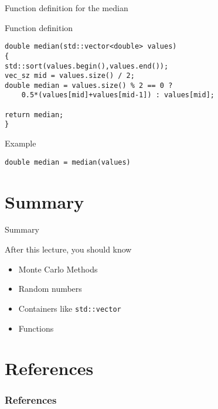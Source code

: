 \documentclass[12pt]{beamer}
\begin{document}
\begin{frame}[fragile]{Function definition for the median}

\begin{block}{Function definition}
\begin{lstlisting}
double median(std::vector<double> values)
{
std::sort(values.begin(),values.end());
vec_sz mid = values.size() / 2;
double median = values.size() % 2 == 0 ? 
    0.5*(values[mid]+values[mid-1]) : values[mid];
    
return median;
}
\end{lstlisting}
\end{block}

\begin{block}{Example}

\lstinline|double median = median(values)|

\end{block}

\end{frame}

\section{Summary}

\begin{frame}{Summary}
\begin{block}{After this lecture, you should know}
\begin{itemize}
\item Monte Carlo Methods
\item Random numbers
\item Containers like \lstinline|std::vector|
\item Functions
\end{itemize}
\end{block}


\end{frame}

\section{References}

\begin{frame}[t, allowframebreaks]
\frametitle{References}


\end{frame}
\end{document}
